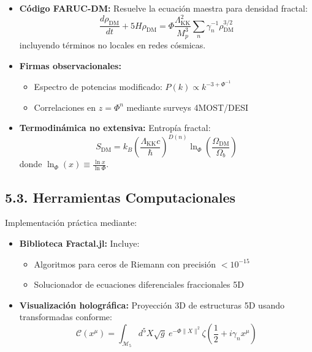 \documentclass[a4paper, 12pt]{article}
\begin{document}
\begin{itemize}
\item \textbf{Código FARUC-DM:} Resuelve la ecuación maestra para densidad fractal:
\[
\frac{d\rho_{\text{DM}}}{dt} + 5H\rho_{\text{DM}} = \Phi\frac{\Lambda_{\text{KK}}^2}{M_p^3}\sum_{n}\gamma_n^{-1}\rho_{\text{DM}}^{3/2}
\]
incluyendo términos no locales en redes cósmicas.

\item \textbf{Firmas observacionales:}
\begin{itemize}
\item Espectro de potencias modificado: $P(k) \propto k^{-3 + \Phi^{-1}}$
\item Correlaciones en $z = \Phi^n$ mediante surveys 4MOST/DESI
\end{itemize}

\item \textbf{Termodinámica no extensiva:} Entropía fractal:
\[
S_{\text{DM}} = k_B\left(\frac{\Lambda_{\text{KK}}c}{\hbar}\right)^{D(n)}\ln_\Phi\left(\frac{\Omega_{\text{DM}}}{\Omega_b}\right)
\]
donde $\ln_\Phi(x) \equiv \frac{\ln x}{\ln \Phi}$.
\end{itemize}

\subsection*{5.3. Herramientas Computacionales}
Implementación práctica mediante:

\begin{itemize}
\item \textbf{Biblioteca Fractal.jl:} Incluye:
\begin{itemize}
\item Algoritmos para ceros de Riemann con precisión $<10^{-15}$
\item Solucionador de ecuaciones diferenciales fraccionales 5D
\end{itemize}

\item \textbf{Visualización holográfica:} Proyección 3D de estructuras 5D usando transformadas conforme:
\[
\mathscr{C}(x^\mu) = \int_{\mathscr{M}_5} d^5X \sqrt{g}\ e^{-\Phi\|X\|^2}\zeta(\frac{1}{2} + i\gamma_n x^\mu)
\]
\end{itemize}
\end{document}
